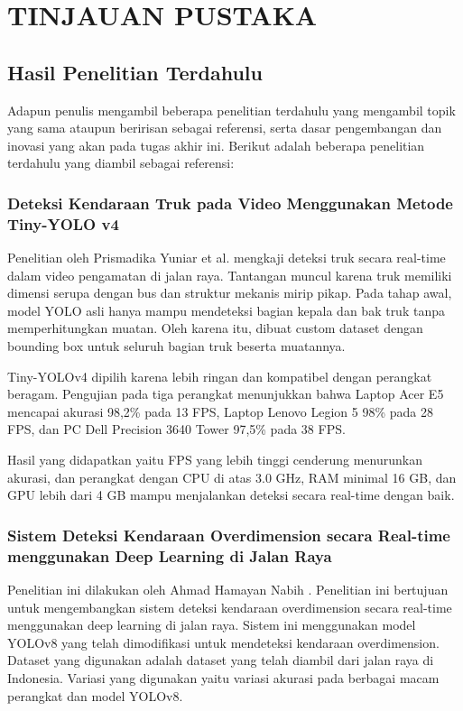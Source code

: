 \chapter{TINJAUAN PUSTAKA}
\label{chap:tinjauanpustaka}



\section{Hasil Penelitian Terdahulu}
\label{sec:hasilpenelitianterdahulu}
Adapun penulis mengambil beberapa penelitian terdahulu yang mengambil topik yang sama ataupun beririsan sebagai referensi, serta dasar pengembangan dan inovasi yang akan pada tugas akhir ini. Berikut adalah beberapa penelitian terdahulu yang diambil sebagai referensi:

\subsection{Deteksi Kendaraan Truk pada Video Menggunakan Metode Tiny-YOLO v4}
\label{subsec:deteksikendaraantrukprismadika}
Penelitian oleh Prismadika Yuniar et al. \parencite*{prismadika2023} mengkaji deteksi truk secara real-time dalam video pengamatan di jalan raya. Tantangan muncul karena truk memiliki dimensi serupa dengan bus dan struktur mekanis mirip pikap. Pada tahap awal, model YOLO asli hanya mampu mendeteksi bagian kepala dan bak truk tanpa memperhitungkan muatan. Oleh karena itu, dibuat custom dataset dengan bounding box untuk seluruh bagian truk beserta muatannya.

Tiny-YOLOv4 dipilih karena lebih ringan dan kompatibel dengan perangkat beragam. Pengujian pada tiga perangkat menunjukkan bahwa Laptop Acer E5 mencapai akurasi 98,2\% pada 13 FPS, Laptop Lenovo Legion 5 98\% pada 28 FPS, dan PC Dell Precision 3640 Tower 97,5\% pada 38 FPS. 

Hasil yang didapatkan yaitu FPS yang lebih tinggi cenderung menurunkan akurasi, dan perangkat dengan CPU di atas 3.0 GHz, RAM minimal 16 GB, dan GPU lebih dari 4 GB mampu menjalankan deteksi secara real-time dengan baik.

\subsection{Sistem Deteksi Kendaraan Overdimension secara Real-time menggunakan Deep Learning di Jalan Raya}
\label{subsec:deteksikendaraanoverdimensionhamayan}
Penelitian ini dilakukan oleh Ahmad Hamayan Nabih \parencite*{hamayan2024}. Penelitian ini bertujuan untuk mengembangkan sistem deteksi kendaraan overdimension secara real-time menggunakan deep learning di jalan raya. Sistem ini menggunakan model YOLOv8 yang telah dimodifikasi untuk mendeteksi kendaraan overdimension. Dataset yang digunakan adalah dataset yang telah diambil dari jalan raya di Indonesia. Variasi yang digunakan yaitu variasi akurasi pada berbagai macam perangkat dan model YOLOv8.

